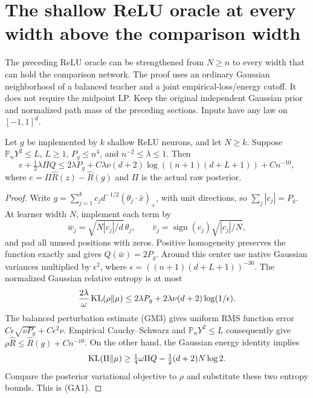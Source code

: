 \section{The shallow ReLU oracle at every width above the comparison width}
\label{sec:all-width-relu}
The preceding ReLU oracle can be strengthened from $N\ge n$ to
every width that can hold the comparison network. The proof uses an
ordinary Gaussian neighborhood of a balanced teacher and a joint
empirical-loss/energy cutoff. It does not require the midpoint LP.
Keep the original independent Gaussian prior and normalized path
mass of the preceding sections. Inputs have any law on $[-1,1]^d$.

\begin{lemma}
Let $g$ be implemented by $k$ shallow ReLU neurons, and let $N\ge k$.
Suppose $\mathbb P_nY^2\le L$, $L\ge1$, $P_g\le n^4$, and
$n^{-2}\le\lambda\le1$. Then
\[
 e+\tfrac12\lambda\Pi Q
 \le2\lambda P_g+C\lambda\nu(d+2)
           \log((n+1)(d+L+1))+Cn^{-10},                 \tag{GA1}
\]
where $e=\Pi\widehat R(z)-\widehat R(g)$ and $\Pi$ is the
actual raw posterior.
\end{lemma}
\begin{proof}
Write $g=\sum_{j=1}^k c_jd^{-1/2}(\theta_j\cdot\bar x)_+$,
with unit directions, so $\sum_j|c_j|=P_g$.
At learner width $N$, implement each term by
\[
 \bar w_j=\sqrt{N|c_j|/d}\,\theta_j,\qquad
 \bar v_j=\operatorname{sign}(c_j)\sqrt{|c_j|/N},
\]
and pad all unused positions with zeros. Positive homogeneity
preserves the function exactly and gives $Q(\bar w)=2P_g$.
Around this center use native Gaussian variances multiplied by
$\epsilon^2$, where $\epsilon=((n+1)(d+L+1))^{-30}$.
The normalized Gaussian relative entropy is at most
\[
 \frac{2\lambda}{\omega}\operatorname{KL}(\rho\|\mu)
 \le2\lambda P_g+2\lambda\nu(d+2)\log(1/\epsilon).
\]
The balanced perturbation estimate (GM3) gives uniform RMS function
error $C\epsilon\sqrt{\nu P_g}+C\epsilon^2\nu$.
Empirical Cauchy--Schwarz and $\mathbb P_nY^2\le L$ consequently give
$\rho\widehat R\le\widehat R(g)+Cn^{-10}$.
On the other hand, the Gaussian energy identity implies
\[
 \operatorname{KL}(\Pi\|\mu)\ge\tfrac14\omega\Pi Q
                       -\tfrac12(d+2)N\log2.
\]
Compare the posterior variational objective to $\rho$ and substitute
these two entropy bounds. This is (GA1).
\end{proof}

